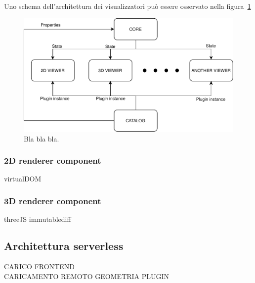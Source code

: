 Uno schema dell'architettura dei visualizzatori pu\`o essere osservato nella figura~\ref{fig_visualizators}
\begin{figure}[!t]
\centering
\includegraphics[width=\linewidth]{contents/images/diagramma-visualizzatori}

\caption{Bla bla bla.}
\label{fig_visualizators}
\end{figure}

\subsubsection{2D renderer component}
virtualDOM


\subsubsection{3D renderer component}
threeJS immutablediff

\subsection{Architettura serverless}
    CARICO FRONTEND\\
    CARICAMENTO REMOTO GEOMETRIA PLUGIN\\